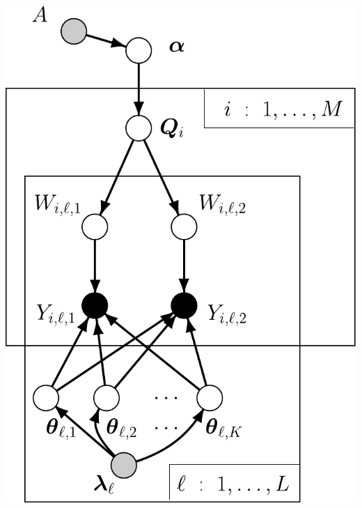 \vspace*{-.3in}
\begin{minipage}{.42\textwidth}
\vfill
\hfill\includegraphics*[width=.95\textwidth]{illus/PritchSimple.pdf}
\vfill
\end{minipage}
\hfill
